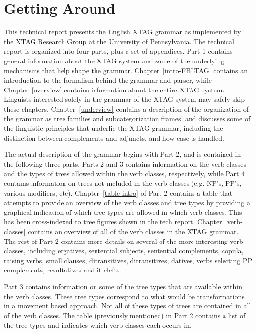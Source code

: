 \chapter{Getting Around}

This technical report presents the English XTAG grammar as implemented by
the XTAG Research Group at the University of Pennsylvania.  The technical
report is organized into four parts, plus a set of appendices.  Part 1
contains general information about the XTAG system and some of the
underlying mechanisms that help shape the grammar.
Chapter~\ref{intro-FBLTAG} contains an introduction to the formalism behind
the grammar and parser, while Chapter~\ref{overview} contains information
about the entire XTAG system.  Linguists interested solely in the grammar
of the XTAG system may safely skip these chapters. Chapter~\ref{underview}
contains a description of the organization of the grammar as tree families
and subcategorization frames, and discusses some of the linguistic
principles that underlie the XTAG grammar, including the distinction
between complements and adjuncts, and how case is handled.

The actual description of the grammar begins with Part 2, and is contained
in the following three parts.  Parts 2 and 3 contains information on the
verb classes and the types of trees allowed within the verb classes,
respectively, while Part 4 contains information on trees not included in
the verb classes (e.g.  NP's, PP's, various modifiers, etc).
Chapter~\ref{table-intro} of Part 2 contains a table that attempts to
provide an overview of the verb classes and tree types by providing a
graphical indication of which tree types are allowed in which verb classes.
This has been cross-indexed to tree figures shown in the tech report.
Chapter~\ref{verb-classes} contains an overview of all of the verb classes
in the XTAG grammar.  The rest of Part 2 contains more details on several
of the more interesting verb classes, including ergatives, sentential
subjects, sentential complements, copula, raising verbs, small clauses,
ditransitives, ditransitives, datives, verbs selecting PP complements,
resultatives and it-clefts.

Part 3 contains information on some of the tree types that are available within
the verb classes.  These tree types correspond to what would be transformations
in a movement based approach.  Not all of these types of trees are contained in
all of the verb classes.  The table (previously mentioned) in Part 2 contains a
list of the tree types and indicates which verb classes each occurs in.  

